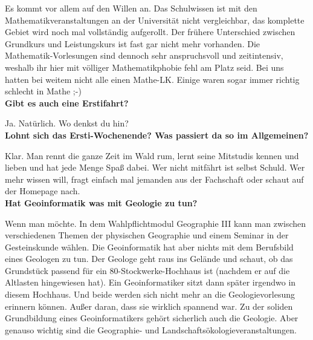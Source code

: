 Es kommt vor allem auf den Willen an. Das Schulwissen ist mit den Mathematikveranstaltungen an der Universität nicht vergleichbar, das komplette Gebiet wird noch mal vollständig aufgerollt. Der frühere Unterschied zwischen Grundkurs und Leistungskurs ist fast gar nicht mehr vorhanden. Die Mathematik-Vorlesungen sind dennoch sehr anspruchsvoll und zeitintensiv, weshalb ihr hier mit völliger Mathematikphobie fehl am Platz seid. Bei uns hatten bei weitem nicht alle einen Mathe-LK. Einige waren sogar immer richtig schlecht in Mathe ;-)\\

\textbf{Gibt es auch eine Erstifahrt?}

Ja. Natürlich. Wo denkst du hin?\\

\textbf{Lohnt sich das Ersti-Wochenende? Was passiert da so im Allgemeinen?}

Klar. Man rennt die ganze Zeit im Wald rum, lernt seine Mitstudis kennen und lieben und hat jede Menge Spaß dabei. Wer nicht mitfährt ist selbst Schuld. Wer mehr wissen will, fragt einfach mal jemanden aus der Fachschaft oder schaut auf der Homepage nach.\\





\textbf{Hat Geoinformatik was mit Geologie zu tun?}

Wenn man möchte. In dem Wahlpﬂichtmodul Geographie III kann man zwischen verschiedenen Themen der physischen Geographie und einem Seminar in der Gesteinskunde wählen. Die Geoinformatik hat aber nichts mit dem Berufsbild eines Geologen zu tun. Der Geologe geht raus ins Gelände und schaut, ob das Grundstück passend für ein 80-Stockwerke-Hochhaus ist (nachdem er auf die Altlasten hingewiesen hat). Ein Geoinformatiker sitzt dann später irgendwo in diesem Hochhaus. Und beide werden sich nicht mehr an die Geologievorlesung erinnern können. Außer daran, dass sie wirklich spannend war. Zu der soliden Grundbildung eines Geoinformatikers gehört sicherlich auch die Geologie. Aber genauso wichtig sind die Geographie- und Landschaftsökologieveranstaltungen.\\

